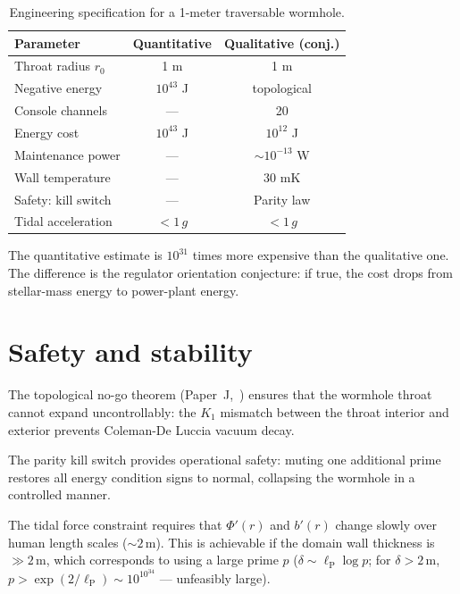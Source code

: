 \documentclass[11pt,a4paper]{article}
\newcommand{\lP}{\ell_{\mathrm{P}}}
\begin{document}
\begin{table}[h]
\centering
\caption{Engineering specification for a 1-meter traversable wormhole.}
\label{tab:spec}
\begin{tabular}{@{}lcc@{}}
\toprule
Parameter & Quantitative & Qualitative (conj.) \\
\midrule
Throat radius $r_0$ & 1 m & 1 m \\
Negative energy & $10^{43}$ J & topological \\
Console channels & --- & 20 \\
Energy cost & $10^{43}$ J & $10^{12}$ J \\
Maintenance power & --- & $\sim 10^{-13}$ W \\
Wall temperature & --- & 30 mK \\
Safety: kill switch & --- & Parity law \\
Tidal acceleration & $< 1\,g$ & $< 1\,g$ \\
\bottomrule
\end{tabular}
\end{table}

The quantitative estimate is $10^{31}$ times more expensive than
the qualitative one. The difference is the regulator orientation
conjecture: if true, the cost drops from stellar-mass energy to
power-plant energy.

\section{Safety and stability}
\label{sec:safety}

The topological no-go theorem (Paper~J,~\cite{paper_J}) ensures
that the wormhole throat cannot expand uncontrollably: the $K_1$
mismatch between the throat interior and exterior prevents
Coleman-De Luccia vacuum decay.

The parity kill switch provides operational safety: muting one
additional prime restores all energy condition signs to normal,
collapsing the wormhole in a controlled manner.

The tidal force constraint requires that $\Phi'(r)$ and
$b'(r)$ change slowly over human length scales ($\sim 2\,\mathrm{m}$).
This is achievable if the domain wall thickness is
$\gg 2\,\mathrm{m}$, which corresponds to using a large prime $p$
($\delta \sim \lP \log p$; for $\delta > 2\,\mathrm{m}$,
$p > \exp(2/\lP) \sim 10^{10^{34}}$ --- unfeasibly large).
\end{document}

